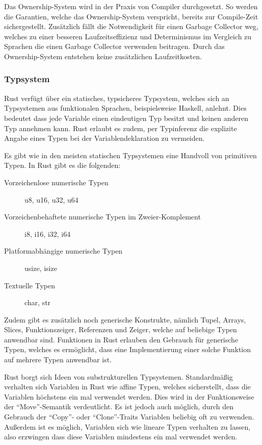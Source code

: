 Das Ownership-System wird in der Praxis von Compiler durchgesetzt. So werden die Garantien, welche das Ownership-System
verspricht, bereits zur Compile-Zeit sichergestellt. Zusätzlich fällt die Notwendigkeit für einen Garbage Collector weg, welches
zu einer besseren Laufzeitseffizienz und Determinismus im Vergleich zu Sprachen die einen Garbage Collector verwenden beitragen.
Durch das Ownership-System entstehen keine zusätzlichen Laufzeitkosten\cite{whatIsOwnership}.

\subsubsection{Typsystem}

Rust verfügt über ein statisches, typsicheres Typsystem, welches sich an Typsystemen aus funktionalen Sprachen, beispielsweise Haskell, anlehnt\cite{rustWikiDe}. Dies bedeutet dass jede Variable einen eindeutigen Typ besitzt und keinen
anderen Typ annehmen kann. Rust erlaubt es zudem, per Typinferenz die explizite Angabe eines Typen bei der Variablendeklaration zu
vermeiden\cite{rustWikiDe}.

Es gibt wie in den meisten statischen Typsystemen eine Handvoll von primitiven Typen. In Rust gibt es die folgenden\cite{rustTypes}:

\begin{description}
	\item[Vorzeichenlose numerische Typen] u8, u16, u32, u64
	\item[Vorzeichenbehaftete numerische Typen im Zweier-Komplement] i8, i16, i32, i64
	\item[Platformabhängige numerische Typen] usize, isize
	\item[Textuelle Typen] char, str
\end{description}

Zudem gibt es zusätzlich noch generische Konstrukte, nämlich Tupel, Arrays, Slices, Funktionszeiger, Referenzen und Zeiger, welche
auf beliebige Typen anwendbar sind\cite{rustTypes}. Funktionen in Rust erlauben den Gebrauch für generische Typen, welches es
ermöglicht, dass eine Implementierung einer solche Funktion auf mehrere Typen anwendbar ist.

Rust borgt sich Ideen von substrukturellen Typsystemen\cite{linearTypePain}. Standardmäßig verhalten sich Variablen in Rust wie
affine Typen, welches sicherstellt, dass die Variablen höchstens ein mal verwendet werden\cite{substructuralTypesWikiEn}.
Dies wird in der Funktionsweise der "`Move"'-Semantik verdeutlicht\cite{linearTypePain}.
Es ist jedoch auch möglich, durch den Gebrauch der "`Copy"'- oder "`Clone"'-Traits Variablen
beliebig oft zu verwenden\cite{linearTypePain}.
Außerdem ist es möglich, Variablen sich wie lineare Typen verhalten zu lassen, also erzwingen dass diese Variablen mindestens
ein mal verwendet werden\cite{linearTypePain}.


